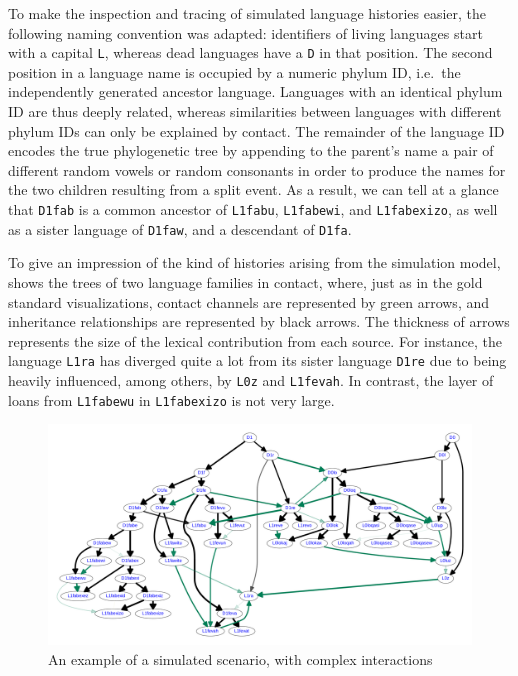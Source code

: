 To make the inspection and tracing of simulated language histories easier, the following naming convention was adapted: identifiers of living languages start with a capital \texttt{L}, whereas dead languages have a \texttt{D} in that position. The second position in a language name is occupied by a numeric phylum ID, i.e.\ the independently generated ancestor language. Languages with an identical phylum ID are thus deeply related, whereas similarities between languages with different phylum IDs can only be explained by contact. The remainder of the language ID encodes the true phylogenetic tree by appending to the parent's name a pair of different random vowels or random consonants in order to produce the names for the two children resulting from a split event. As a result, we can tell at a glance that \texttt{D1fab} is a common ancestor of \texttt{L1fabu}, \texttt{L1fabewi}, and \texttt{L1fabexizo}, as well as a sister language of \texttt{D1faw}, and a descendant of \texttt{D1fa}.

To give an impression of the kind of histories arising from the simulation model,  shows the trees of two language families in contact, where, just as in the gold standard visualizations, contact channels are represented by green arrows, and inheritance relationships are represented by black arrows. The thickness of arrows represents the size of the lexical contribution from each source. For instance, the language \texttt{L1ra} has diverged quite a lot from its sister language \texttt{D1re} due to being heavily influenced, among others, by \texttt{L0z} and \texttt{L1fevah}. In contrast, the layer of loans from \texttt{L1fabewu} in \texttt{L1fabexizo} is not very large.

\begin{figure}
 \begin{center}
 \includegraphics[width=\textwidth]{figures/sim-example-goldstandard-graph.pdf}
 \caption{An example of a simulated scenario, with complex interactions}
 \label{simulated-tree}
 \end{center}
\end{figure}

